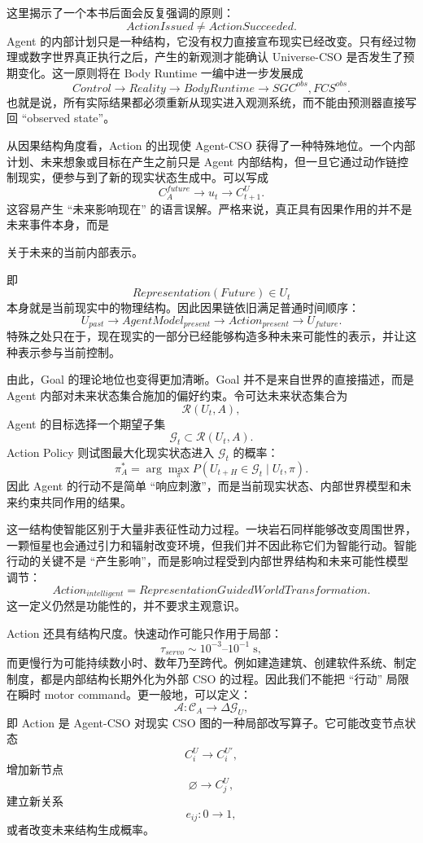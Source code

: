 这里揭示了一个本书后面会反复强调的原则：
\[
\boxed{
ActionIssued
\neq
ActionSucceeded.
}
\]
Agent 的内部计划只是一种结构，它没有权力直接宣布现实已经改变。只有经过物理或数字世界真正执行之后，产生的新观测才能确认 Universe-CSO 是否发生了预期变化。这一原则将在 Body Runtime 一编中进一步发展成
\[
Control
\rightarrow
Reality
\rightarrow
BodyRuntime
\rightarrow
SGC^{obs},FCS^{obs}.
\]
也就是说，所有实际结果都必须重新从现实进入观测系统，而不能由预测器直接写回 ``observed state''。

从因果结构角度看，Action 的出现使 Agent-CSO 获得了一种特殊地位。一个内部计划、未来想象或目标在产生之前只是 Agent 内部结构，但一旦它通过动作链控制现实，便参与到了新的现实状态生成中。可以写成
\[
C^{future}_A
\longrightarrow
u_t
\longrightarrow
C^U_{t+1}.
\]
这容易产生 ``未来影响现在'' 的语言误解。严格来说，真正具有因果作用的并不是未来事件本身，而是
\begin{statementbox}
关于未来的当前内部表示。
\end{statementbox}
即
\[
Representation(Future)
\in
U_t
\]
本身就是当前现实中的物理结构。因此因果链依旧满足普通时间顺序：
\[
U_{past}
\rightarrow
AgentModel_{present}
\rightarrow
Action_{present}
\rightarrow
U_{future}.
\]
特殊之处只在于，现在现实的一部分已经能够构造多种未来可能性的表示，并让这种表示参与当前控制。

由此，Goal 的理论地位也变得更加清晰。Goal 并不是来自世界的直接描述，而是 Agent 内部对未来状态集合施加的偏好约束。令可达未来状态集合为
\[
\mathcal{R}(U_t,A),
\]
Agent 的目标选择一个期望子集
\[
\mathcal{G}_t
\subset
\mathcal{R}(U_t,A).
\]
Action Policy 则试图最大化现实状态进入 $\mathcal G_t$ 的概率：
\[
\pi_A^*
=
\arg\max_{\pi}
P
\left(
U_{t+H}\in\mathcal G_t
\mid
U_t,\pi
\right).
\]
因此 Agent 的行动不是简单 ``响应刺激''，而是当前现实状态、内部世界模型和未来约束共同作用的结果。

这一结构使智能区别于大量非表征性动力过程。一块岩石同样能够改变周围世界，一颗恒星也会通过引力和辐射改变环境，但我们并不因此称它们为智能行动。智能行动的关键不是 ``产生影响''，而是影响过程受到内部世界结构和未来可能性模型调节：
\[
\boxed{
Action_{intelligent}
=
RepresentationGuidedWorldTransformation.
}
\]
这一定义仍然是功能性的，并不要求主观意识。

Action 还具有结构尺度。快速动作可能只作用于局部：
\[
\tau_{servo}
\sim
10^{-3}\text{--}10^{-1}\;\mathrm{s},
\]
而更慢行为可能持续数小时、数年乃至跨代。例如建造建筑、创建软件系统、制定制度，都是内部结构长期外化为外部 CSO 的过程。因此我们不能把 ``行动'' 局限在瞬时 motor command。更一般地，可以定义：
\[
\mathcal A:
\mathcal C_A
\rightarrow
\Delta \mathcal G_U,
\]
即 Action 是 Agent-CSO 对现实 CSO 图的一种局部改写算子。它可能改变节点状态
\[
C_i^U\rightarrow C_i^{U'},
\]
增加新节点
\[
\varnothing\rightarrow C_j^U,
\]
建立新关系
\[
e_{ij}:0\rightarrow1,
\]
或者改变未来结构生成概率。

